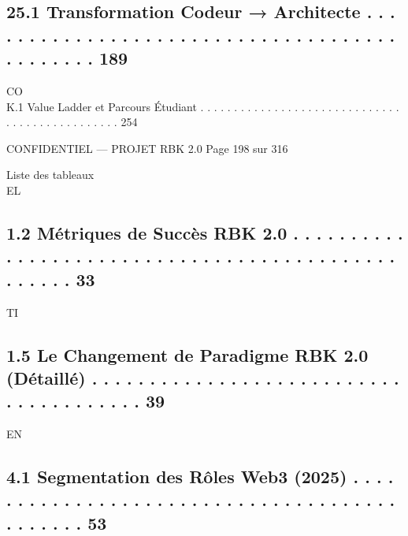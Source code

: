 \documentclass[12pt,landscape,a4paper]{article}
\newenvironment{confidential}
{\begin{tcolorbox}[
    colback=rbkred!5!white,
    colframe=rbkred!75!black,
    title=CONFIDENTIEL,
    fonttitle=\bfseries\color{white},
    coltitle=rbkred!75!black,
    breakable,
    enhanced,
    frame hidden,
    borderline west={2pt}{0pt}{rbkred!75!black}
]}
{\end{tcolorbox}}
\begin{document}
\subsection{25.1 Transformation Codeur → Architecte . . . . . . . . . . . . . . . . . . . . . . . . . . . . . . . . . . . . . . . . . . . . . 189}
CO\\
K.1 Value Ladder et Parcours Étudiant . . . . . . . . . . . . . . . . . . . . . . . . . . . . . . . . . . . . . . . . . . . . . . . 254\\
\vspace{0.5em}
\vspace{0.5em}
\vspace{0.5em}
\vspace{0.5em}
\begin{confidential}CONFIDENTIEL — PROJET RBK 2.0                                Page 198 sur 316\end{confidential}
Liste des tableaux\\
\vspace{0.5em}
\vspace{0.5em}
\vspace{0.5em}
\vspace{0.5em}
EL\\
\subsection{1.2 Métriques de Succès RBK 2.0 . . . . . . . . . . . . . . . . . . . . . . . . . . . . . . . . . . . . . . . . . . . . . . . . . .     33}
\vspace{0.5em}
\vspace{0.5em}
\vspace{0.5em}
\vspace{0.5em}
TI\\
\subsection{1.5 Le Changement de Paradigme RBK 2.0 (Détaillé) . . . . . . . . . . . . . . . . . . . . . . . . . . . . . . . . . . . . . . .         39}
\vspace{0.5em}
\vspace{0.5em}
\vspace{0.5em}
\vspace{0.5em}
EN\\
\subsection{4.1 Segmentation des Rôles Web3 (2025) . . . . . . . . . . . . . . . . . . . . . . . . . . . . . . . . . . . . . . . . . . . . .        53}
\end{document}
